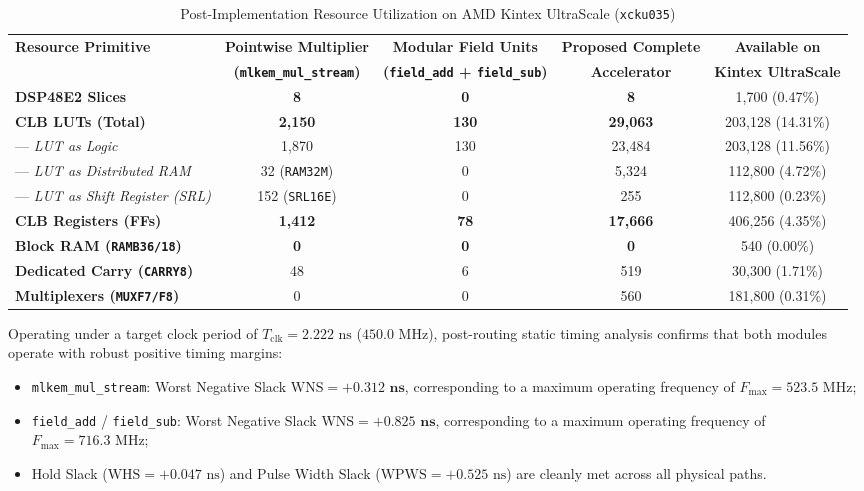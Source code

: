 \begin{table}[!t]
\caption{Post-Implementation Resource Utilization on AMD Kintex UltraScale (\texttt{xcku035})}
\label{tab:resource_breakdown_pwm}
\centering
\footnotesize
\begin{tabular*}{\textwidth}{@{\extracolsep{\fill}} lcccc @{}}
\toprule
\textbf{Resource Primitive} & \textbf{Pointwise Multiplier} & \textbf{Modular Field Units} & \textbf{Proposed Complete} & \textbf{Available on} \\
 & \textbf{(\texttt{mlkem\_mul\_stream})} & \textbf{(\texttt{field\_add} + \texttt{field\_sub})} & \textbf{Accelerator} & \textbf{Kintex UltraScale} \\
\midrule
\textbf{DSP48E2 Slices}         & \textbf{8}   & \textbf{0}   & \textbf{8}      & 1,700 (0.47\%) \\
\textbf{CLB LUTs (Total)}       & \textbf{2,150} & \textbf{130} & \textbf{29,063} & 203,128 (14.31\%) \\
--- \textit{LUT as Logic}              & 1,870        & 130          & 23,484          & 203,128 (11.56\%) \\
--- \textit{LUT as Distributed RAM}    & 32 (\texttt{RAM32M})  & 0            & 5,324           & 112,800 (4.72\%) \\
--- \textit{LUT as Shift Register (SRL)}& 152 (\texttt{SRL16E})& 0            & 255             & 112,800 (0.23\%) \\
\textbf{CLB Registers (FFs)}    & \textbf{1,412} & \textbf{78}  & \textbf{17,666} & 406,256 (4.35\%) \\
\textbf{Block RAM (\texttt{RAMB36/18})}  & \textbf{0}   & \textbf{0}   & \textbf{0}      & 540 (0.00\%) \\
\textbf{Dedicated Carry (\texttt{CARRY8})}& 48          & 6            & 519             & 30,300 (1.71\%) \\
\textbf{Multiplexers (\texttt{MUXF7/F8})}& 0           & 0            & 560             & 181,800 (0.31\%) \\
\bottomrule
\end{tabular*}
\end{table}

Operating under a target clock period of $T_{\text{clk}} = 2.222\text{ ns}$ ($450.0\text{ MHz}$), post-routing static timing analysis confirms that both modules operate with robust positive timing margins:
\begin{itemize}
    \item \texttt{mlkem\_mul\_stream}: Worst Negative Slack $\text{WNS} = \mathbf{+0.312\text{ ns}}$, corresponding to a maximum operating frequency of $F_{\text{max}} = 523.5\text{ MHz}$;
    \item \texttt{field\_add} / \texttt{field\_sub}: Worst Negative Slack $\text{WNS} = \mathbf{+0.825\text{ ns}}$, corresponding to a maximum operating frequency of $F_{\text{max}} = 716.3\text{ MHz}$;
    \item Hold Slack ($\text{WHS} = +0.047\text{ ns}$) and Pulse Width Slack ($\text{WPWS} = +0.525\text{ ns}$) are cleanly met across all physical paths.
\end{itemize}

